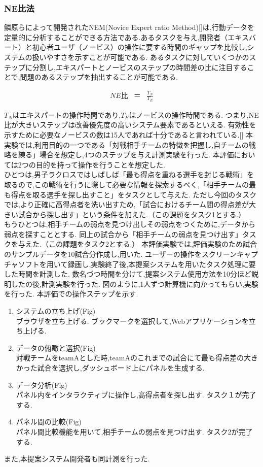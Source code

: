 \documentclass[sotsuron]{kuee}
\begin{document}
				\subsubsection{NE比法}
					鱗原らによって開発されたNEM(Novice Expert ratio Method)[]は,行動データを定量的に分析することができる方法である.あるタスクを与え,開発者（エキスバート）と初心者ユーザ（ノービス）の操作に要する時間のギャップを比較し,システムの扱いやすさを示すことが可能である.
					あるタスクに対していくつかのステップに分割し,エキスパートとノービスのステップの時間差の比に注目することで,問題のあるステップを抽出することが可能である.

					\begin{eqnarray}
						NE比 & ＝ & \frac{T_N}{T_E}
					\end{eqnarray}
					
					$T_N$はエキスパートの操作時間であり,$T_E$はノービスの操作時間である.
					つまり,NE比が大きいステップは改善優先度の高いシステム要素であるといえる.
					有効性を示すために必要なノービスの数は15人であれば十分であると言われている.[]
			本実験では,利用目的の一つである「対戦相手チームの特徴を把握し,自チームの戦略を練る」場合を想定し,4つのステップを与え計測実験を行った.
			本評価においては2つの目的を持って操作を行うことを想定した.
			\\ひとつは,男子ラクロスではしばしば「最も得点を重ねる選手を封じる戦術」を取るので,この戦術を行うに際して必要な情報を探索するべく,「相手チームの最も得点を取る選手を探し出すこと」をタスクとして与えた.
			ただし今回のタスクでは,より正確に高得点者を洗い出すため,「試合におけるチーム間の得点差が大きい試合から探し出す」という条件を加えた.（この課題をタスク1とする.）
			\\もうひとつは,相手チームの弱点を見つけ出しその弱点をつくために,データから弱点を探すこととする.
			同上の試合から「相手チームの弱点を見つけ出す」タスクを与えた.（この課題をタスク2とする.）
			本評価実験では,評価実験のため試合のサンプルデータを10試合分作成し,用いた.
			ユーザーの操作をスクリーンキャプチャソフトを用いて録画し,実験終了後,本提案システムを用いたタスク処理に要した時間を計測した.
			数名づつ時間を分けて,提案システム使用方法を10分ほど説明したの後,計測実験を行った.
			図のように,1人ずつ計算機に向かってもらい,実験を行った.
			本評価での操作ステップを示す.
			\begin{enumerate}
				\item システムの立ち上げ(Fig)
				\\ブラウザを立ち上げる.
				ブックマークを選択して,Webアプリケーションを立ち上げる.
				\item データの俯瞰と選択(Fig)
				\\対戦チームをteamAとした時,teamAのこれまでの試合にて最も得点差の大きかった試合を選択し,ダッシュボード上にパネルを生成する.
				\item データ分析(Fig)
				\\パネル内をインタラクティブに操作し,高得点者を探し出す.
				タスク１が完了する.
				\item パネル間の比較(Fig)
				\\パネル間比較機能を用いて,相手チームの弱点を見つけ出す.
				タスク2が完了する.
			\end{enumerate}
			また,本提案システム開発者も同計測を行った.
\end{document}

